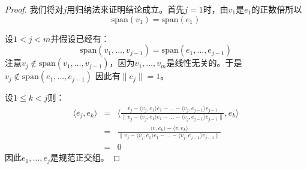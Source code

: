 \documentclass[10pt,a4paper,UTF8]{article}
\begin{document}
\begin{proof}
我们将对\(j\)用归纳法来证明结论成立。首先\(j=1\)时，由\(v_{1}\)是\(e_{1}\)的正数倍所以\[ \mathrm{span} (v_{1}) = \mathrm{span}(e_{1})\]

设\(1 < j < m\)并假设已经有：
\[ \mathrm{span}(v_{1},\ldots ,v_{j-1})  = \mathrm{span}(e_{1},\ldots ,e_{j-1})\]
注意\(v_{j}\notin \mathrm{span}(v_{1},\ldots ,v_{j-1})\)，因为\(v_{1},\ldots ,v_{m}\)是线性无关的。于是\(v_{j}\notin \mathrm{span}(e_{1},\ldots ,e_{j-1})\) 因此有\(\| e_{j} \| = 1\)。

设\(1 \leq k < j\)则：
\begin{eqnarray}
\label{eq:9}
\langle e_{j},e_{k} \rangle  &=&  \bigg \langle \frac{v_{j} - \langle v_{j},e_{1} \rangle e_{1} - \ldots - \langle v_{j},e_{j-1} \rangle e_{j-1}   }{ \| v_{j} - \langle v_{j},e_{1} \rangle e_{1} - \ldots - \langle v_{j},e_{j-1} \rangle e_{j-1} \|} ,e_{k} \bigg\rangle \\
&=&\frac{ \langle v,e_{k} \rangle - \langle v,e_{k} \rangle   }{  \| v_{j} - \langle v_{j},e_{1} \rangle e_{1} - \ldots - \langle v_{j},e_{j-1} \rangle e_{j-1} \|} \\
&=& 0
\end{eqnarray}
因此\(e_{1},\ldots ,e_{j}\)是规范正交组。
\end{proof}
\end{document}
